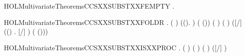 \newcommand{\HOLMultivariateTheoremsCCSXXSUBSTXXelimYY}{\UseVerbatim{HOLMultivariateTheoremsCCSXXSUBSTXXelimYY}}
\begin{SaveVerbatim}{HOLMultivariateTheoremsCCSXXSUBSTXXFEMPTY}
\HOLTokenTurnstile{} \HOLSymConst{\HOLTokenForall{}}.    \HOLSymConst{=} 
\end{SaveVerbatim}
\newcommand{\HOLMultivariateTheoremsCCSXXSUBSTXXFEMPTY}{\UseVerbatim{HOLMultivariateTheoremsCCSXXSUBSTXXFEMPTY}}
\begin{SaveVerbatim}{HOLMultivariateTheoremsCCSXXSUBSTXXFOLDR}
\HOLTokenTurnstile{} \HOLSymConst{\HOLTokenForall{}}  .
         \HOLSymConst{\HOLTokenConj{}} (  \HOLSymConst{=}  ) \HOLSymConst{\HOLTokenConj{}}
        (\HOLTokenLambda{}(\HOLSymConst{,}).   \HOLConst{\HOLTokenSubset{}} \HOLTokenLeftbrace{}\HOLTokenRightbrace{}) ( (\HOLSymConst{,})) \HOLSymConst{\HOLTokenConj{}}
        ( ) ( ) \HOLSymConst{\HOLTokenImp{}}
       ([/]  \HOLSymConst{=}  (\HOLTokenLambda{}(\HOLSymConst{,}) . [/] )  ( (\HOLSymConst{,})))
\end{SaveVerbatim}
\newcommand{\HOLMultivariateTheoremsCCSXXSUBSTXXFOLDR}{\UseVerbatim{HOLMultivariateTheoremsCCSXXSUBSTXXFOLDR}}
\begin{SaveVerbatim}{HOLMultivariateTheoremsCCSXXSUBSTXXISXXPROC}
\HOLTokenTurnstile{} \HOLSymConst{\HOLTokenForall{}}  .
         \HOLSymConst{\HOLTokenConj{}} (  \HOLSymConst{=}  ) \HOLSymConst{\HOLTokenConj{}}   \HOLSymConst{\HOLTokenConj{}}
         \HOLConst{\HOLTokenSubset{}}   \HOLSymConst{\HOLTokenConj{}}  ( ) ( ) \HOLSymConst{\HOLTokenImp{}}
        ([/] )
\end{SaveVerbatim}
